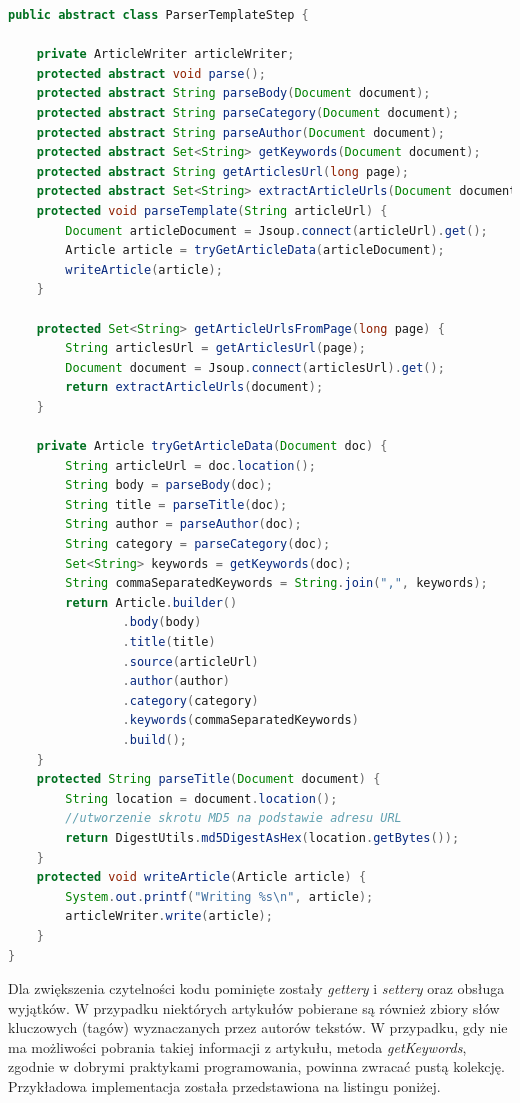 \begin{lstlisting}[language=Java, basicstyle=\tiny, style=javaStyle]
public abstract class ParserTemplateStep {
	
	private ArticleWriter articleWriter;
	protected abstract void parse();
	protected abstract String parseBody(Document document);
	protected abstract String parseCategory(Document document);
	protected abstract String parseAuthor(Document document);
	protected abstract Set<String> getKeywords(Document document);
	protected abstract String getArticlesUrl(long page);
	protected abstract Set<String> extractArticleUrls(Document document);
	protected void parseTemplate(String articleUrl) {
		Document articleDocument = Jsoup.connect(articleUrl).get();
		Article article = tryGetArticleData(articleDocument);
		writeArticle(article);
	}
    
	protected Set<String> getArticleUrlsFromPage(long page) {
		String articlesUrl = getArticlesUrl(page);
		Document document = Jsoup.connect(articlesUrl).get();
		return extractArticleUrls(document);
	}

	private Article tryGetArticleData(Document doc) {
		String articleUrl = doc.location();
		String body = parseBody(doc);
		String title = parseTitle(doc);
		String author = parseAuthor(doc);
		String category = parseCategory(doc);
		Set<String> keywords = getKeywords(doc);
		String commaSeparatedKeywords = String.join(",", keywords);
		return Article.builder()
				.body(body)
				.title(title)
				.source(articleUrl)
				.author(author)
				.category(category)
				.keywords(commaSeparatedKeywords)
				.build();
	}
	protected String parseTitle(Document document) {
		String location = document.location();
        //utworzenie skrotu MD5 na podstawie adresu URL
		return DigestUtils.md5DigestAsHex(location.getBytes());
	}
	protected void writeArticle(Article article) {
		System.out.printf("Writing %s\n", article);
		articleWriter.write(article);
	}
}
\end{lstlisting}
Dla zwiększenia czytelności kodu pominięte zostały \textit{gettery} i \textit{settery} oraz obsługa wyjątków. W przypadku niektórych artykułów pobierane są również zbiory słów kluczowych (tagów) wyznaczanych przez autorów tekstów. W przypadku, gdy nie ma możliwości pobrania takiej informacji z artykułu, metoda \textit{getKeywords}, zgodnie w dobrymi praktykami programowania, powinna zwracać pustą kolekcję. Przykładowa implementacja została przedstawiona na listingu poniżej. 

